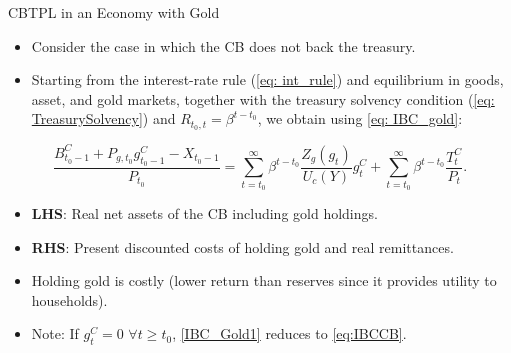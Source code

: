 \documentclass[11pt,aspectratio=169]{beamer}
\begin{document}
\begin{frame}{CBTPL in an Economy with Gold}

\begin{itemize}
\item Consider the case in which the CB does not back the treasury.
    \item Starting from the interest-rate rule (\ref{eq: int_rule}) and equilibrium in goods, asset, and gold markets, together with the treasury solvency condition (\ref{eq: TreasurySolvency}) and $R_{t_0,t} = \beta^{t-t_0}$, we obtain using \eqref{eq: IBC_gold}:
\end{itemize}

\begin{equation}
\frac{B_{t_0-1}^{C}+P_{g,t_0} g_{t_0-1}^{C}-X_{t_0-1}}{P_{t_0}} =
\sum_{t=t_0}^{\infty} \beta^{t-t_0} \frac{Z_g(g_t)}{U_c(Y)} g_t^C +
\sum_{t=t_0}^{\infty} \beta^{t-t_0} \frac{T_t^C}{P_t}. 
\label{IBC_Gold1}
\end{equation}

\begin{itemize}
    \item \textbf{LHS}: Real net assets of the CB including gold holdings.  
    \item \textbf{RHS}: Present discounted costs of holding gold and real remittances.  
    \item Holding gold is costly (lower return than reserves since it provides utility to households).  
    \item Note: If $g_t^C = 0$ $\forall t \ge t_0$, \eqref{IBC_Gold1} reduces to \eqref{eq:IBCCB}.
\end{itemize}
\end{frame}
\end{document}
